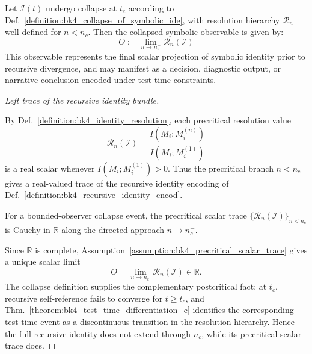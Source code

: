 \begin{lemma}
\label{lemma:bk4_scalar_from_identity_collapse}
Let $\mathcal{I}(t)$ undergo collapse at $t_c$ according to Def.~\ref{definition:bk4_collapse_of_symbolic_ide}, with resolution hierarchy $\mathcal{R}_n$ well-defined for $n < n_c$. Then the collapsed symbolic observable is given by:
\[
O := \lim_{n \to n_c^-} \mathcal{R}_n(\mathcal{I})
\]
This observable represents the final scalar projection of symbolic identity prior to recursive divergence, and may manifest as a decision, diagnostic output, or narrative conclusion encoded under test-time constraints.
\end{lemma}
\begin{proof}[Left trace of the recursive identity bundle]
\label{proof:bk4_scalar_from_identity_collapse}
\leavevmode

By Def.~\ref{definition:bk4_identity_resolution}, each precritical resolution value
\[
\mathcal{R}_n(\mathcal{I})
=\frac{I(M_i;M_i^{(n)})}{I(M_i;M_i^{(1)})}
\]
is a real scalar whenever \(I(M_i;M_i^{(1)})>0\).  Thus the precritical branch \(n<n_c\) gives a real-valued trace of the recursive identity encoding of Def.~\ref{definition:bk4_recursive_identity_encod}.

\begin{assumption}
\label{assumption:bk4_precritical_scalar_trace}
For a bounded-observer collapse event, the precritical scalar trace
\(\{\mathcal{R}_n(\mathcal{I})\}_{n<n_c}\) is Cauchy in \(\mathbb{R}\) along the directed approach \(n\to n_c^-\).
\end{assumption}

Since \(\mathbb{R}\) is complete, Assumption~\ref{assumption:bk4_precritical_scalar_trace} gives a unique scalar limit
\[
O=\lim_{n\to n_c^-}\mathcal{R}_n(\mathcal{I})\in\mathbb{R}.
\]
The collapse definition supplies the complementary postcritical fact: at \(t_c\), recursive self-reference fails to converge for \(t\ge t_c\), and Thm.~\ref{theorem:bk4_test_time_differentiation_c} identifies the corresponding test-time event as a discontinuous transition in the resolution hierarchy.  Hence the full recursive identity does not extend through \(n_c\), while its precritical scalar trace does.


\end{proof}
